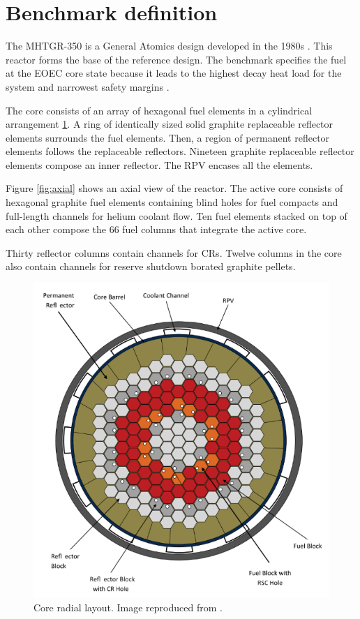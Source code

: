\documentclass{anstrans}
\begin{document}
\section{Benchmark definition}

The MHTGR-350 is a General Atomics design developed in the 1980s \cite{silady_licensing_1988}.
This reactor forms the base of the reference design.
The benchmark specifies the fuel at the \gls{EOEC} core state because it leads to the highest decay heat load for the system and narrowest safety margins \cite{oecd_nea_benchmark_2017}.

The core consists of an array of hexagonal fuel elements in a cylindrical arrangement \ref{fig:radial}.
A ring of identically sized solid graphite replaceable reflector elements surrounds the fuel elements.
Then, a region of permanent reflector elements follows the replaceable reflectors.
Nineteen graphite replaceable reflector elements compose an inner reflector.
The RPV encases all the elements.

Figure \ref{fig:axial} shows an axial view of the reactor.
The active core consists of hexagonal graphite fuel elements containing blind holes for fuel compacts and full-length channels for helium coolant flow.
Ten fuel elements stacked on top of each other compose the 66 fuel columns that integrate the active core.

Thirty reflector columns contain channels for \glspl{CR}.
Twelve columns in the core also contain channels for reserve shutdown borated graphite pellets.

\begin{figure}[htbp!] %
	\centering
	\includegraphics[width=0.95\linewidth]{figures/radial-layout.png}
	\hfill
	\caption{Core radial layout. Image reproduced from \cite{oecd_nea_benchmark_2017}.}
	\label{fig:radial}
\end{figure}
\end{document}
